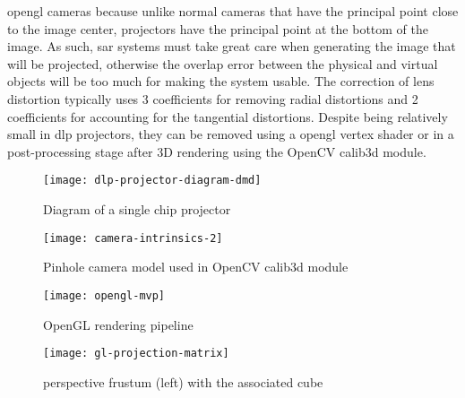 \gls{opengl} cameras because unlike normal cameras that have the principal point close to the image center, projectors have the principal point at the bottom of the image. As such, \gls{sar} systems must take great care when generating the image that will be projected, otherwise the overlap error between the physical and virtual objects will be too much for making the system usable. The correction of lens distortion typically uses 3 coefficients for removing radial distortions and 2 coefficients for accounting for the tangential distortions. Despite being relatively small in \gls{dlp} projectors, they can be removed using a \gls{opengl} vertex shader or in a post-processing stage after 3D rendering using the OpenCV calib3d module.

\begin{figure}[!ht]
	\centering
	\texttt{[image: dlp-projector-diagram-dmd]}
	\caption[Diagram of a single chip  projector]{Diagram of a single chip  projector\protect\footnotemark}
	\label{fig:dlp-projector-diagram-dmd}
	\vspace{-0.7em}
\end{figure}
\vspace{-0.7em}
\begin{figure}[!ht]
	\centering
	\texttt{[image: camera-intrinsics-2]}
	\caption[Pinhole camera model used in OpenCV calib3d module]{Pinhole camera model used in OpenCV calib3d module\protect\footnotemark}
	\label{fig:camera-intrinsics-2}
	\vspace{-0.7em}
\end{figure}
\vspace{-0.7em}
\begin{figure}[!ht]
	\centering
	\texttt{[image: opengl-mvp]}
	\caption[OpenGL rendering pipeline]{OpenGL rendering pipeline\protect\footnotemark}
	\label{fig:opengl-mvp}
	\vspace{-0.7em}
\end{figure}

\begin{figure}[!ht]
	\centering
	\texttt{[image: gl-projection-matrix]}
	\caption[{ perspective frustum (left) with the associated  cube}]{{ perspective frustum (left) with the associated  cube}\protect\footnotemark}
	\label{fig:gl-projection-matrix}
\end{figure}

